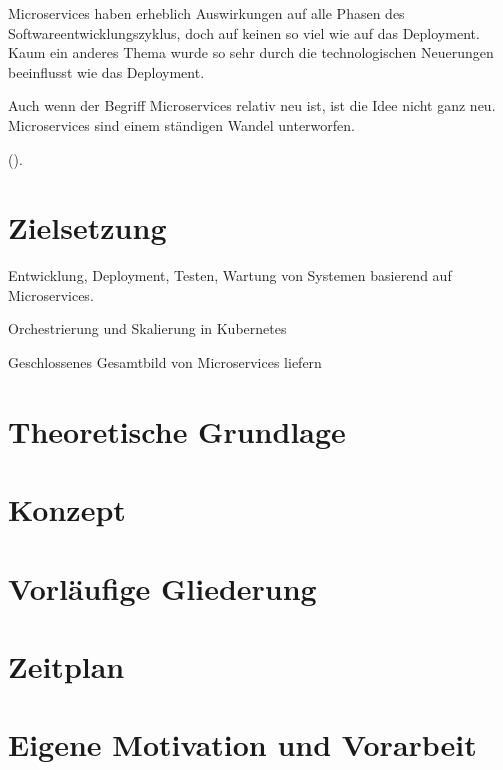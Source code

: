 \documentclass[
	a4paper,
	12pt,
	bibtotoc,
	listof=totoc,
	titlepage
]{scrartcl}
\begin{document}
Microservices haben erheblich Auswirkungen auf alle Phasen des Softwareentwicklungszyklus, doch auf keinen so viel wie auf das Deployment. Kaum ein anderes Thema wurde so sehr durch die technologischen Neuerungen beeinflusst wie das Deployment. 

Auch wenn der Begriff Microservices relativ neu ist, ist die Idee nicht ganz neu. Microservices sind einem ständigen Wandel unterworfen.

(\cite[S. 99]{hightowerKubernetesKompakte2018}).

\section{Zielsetzung}

Entwicklung, Deployment, Testen, Wartung von Systemen basierend auf Microservices.

Orchestrierung und Skalierung in Kubernetes

Geschlossenes Gesamtbild von Microservices liefern

\section{Theoretische Grundlage}
\section{Konzept}
\section{Vorläufige Gliederung}
\section{Zeitplan}
\section{Eigene Motivation und Vorarbeit}

\clearpage
\printbibliography
\end{document}
